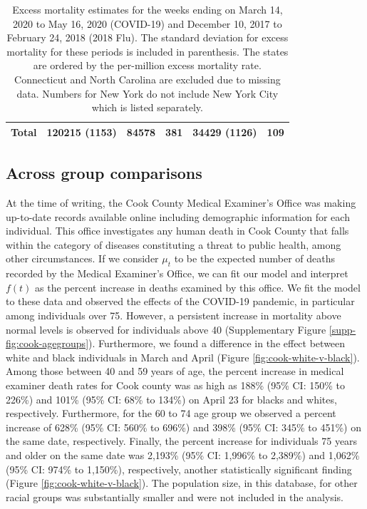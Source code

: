 \documentclass[11pt]{article}
\begin{document}
\begin{table}
\begin{tabular}{|l|lll|ll|}
 \hline
  Total & 120215 (1153) & 84578 & 381 & 34429 (1126) & 109 \\ 
  \hline
 \end{tabular}
 \caption{Excess mortality estimates for the weeks ending on March 14, 2020 to May 16, 2020 (COVID-19) and  December 10, 2017 to February 24, 2018 (2018 Flu). The standard deviation for excess mortality for these periods is included in parenthesis. The states are ordered by the per-million excess mortality rate. Connecticut and North Carolina are excluded due to missing data. Numbers for New York do not include New York City which is listed separately.}
 \label{tab:covid19-states}
 \normalsize
\end{table}
 

\subsection{Across group comparisons}
\label{subsec:group-comparison}
At the time of writing, the Cook County Medical Examiner's Office was making up-to-date records available online including demographic information for each individual. This office investigates any human death in Cook County that falls within the category of diseases constituting a threat to public health, among other circumstances\cite{cookcovid19}. If we consider $\mu_t$ to be the expected number of deaths recorded by the Medical Examiner's Office, we can fit our model and interpret $f(t)$ as the percent increase in deaths examined by this office. We fit the model to these data and observed the effects of the COVID-19 pandemic, in particular among individuals over 75. However, a persistent increase in mortality above normal levels is observed for individuals above 40 (Supplementary Figure \ref{supp-fig:cook-agegroups}). Furthermore, we found a difference in the effect between white and black individuals in March and April (Figure \ref{fig:cook-white-v-black}). Among those between 40 and 59 years of age, the percent increase in medical examiner death rates for Cook county was as high as 188\% (95\% CI: 150\% to 226\%) and 101\% (95\% CI: 68\% to 134\%) on April 23 for blacks and whites, respectively. Furthermore, for the 60 to 74 age group we observed a percent increase of 628\% (95\% CI: 560\% to 696\%) and 398\% (95\% CI: 345\% to 451\%) on the same date, respectively. Finally, the percent increase for individuals 75 years and older on the same date was 2,193\% (95\% CI: 1,996\% to 2,389\%) and 1,062\% (95\% CI: 974\% to  1,150\%), respectively, another statistically significant finding (Figure \ref{fig:cook-white-v-black}). The population size, in this database, for other racial groups was substantially smaller and were not included in the analysis.
\end{document}

